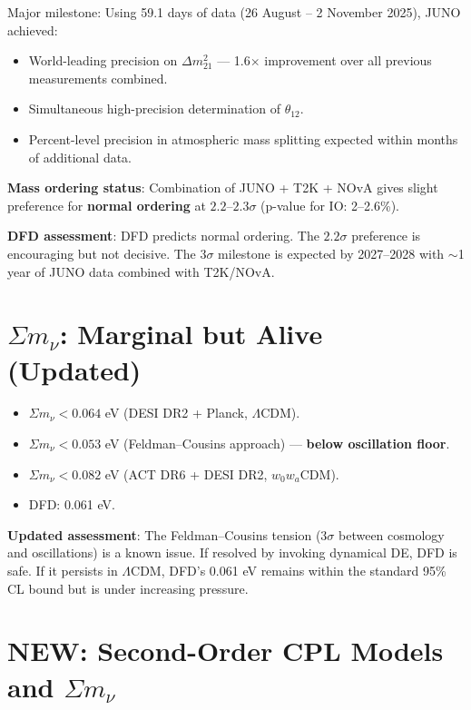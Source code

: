 \documentclass[11pt,a4paper]{article}
\newcommand{\NEW}{\textcolor{dfdblue}{\textbf{NEW}}}
\begin{document}
\begin{tcolorbox}[colback=green!5!white, colframe=green!60!black,
  title={JUNO First Physics Results (November 2025): $\Delta m^2_{21}$ and $\theta_{12}$}]

Major milestone: Using 59.1 days of data (26 August -- 2 November 2025), JUNO achieved:
\begin{itemize}
\item World-leading precision on $\Delta m^2_{21}$ --- 1.6$\times$ improvement over all previous measurements combined.
\item Simultaneous high-precision determination of $\theta_{12}$.
\item Percent-level precision in atmospheric mass splitting expected within months of additional data.
\end{itemize}

\textbf{Mass ordering status}: Combination of JUNO + T2K + NOvA gives slight preference for \textbf{normal ordering} at $2.2$--$2.3\sigma$ (p-value for IO: 2--2.6\%).

\textbf{DFD assessment}: DFD predicts normal ordering. The $2.2\sigma$ preference is encouraging but not decisive. The $3\sigma$ milestone is expected by 2027--2028 with $\sim$1 year of JUNO data combined with T2K/NOvA.
\end{tcolorbox}

\section{$\Sigma m_\nu$: Marginal but Alive (Updated)}

\begin{itemize}
\item $\Sigma m_\nu < 0.064$ eV (DESI DR2 + Planck, $\Lambda$CDM).
\item $\Sigma m_\nu < 0.053$ eV (Feldman--Cousins approach) --- \textbf{below oscillation floor}.
\item $\Sigma m_\nu < 0.082$ eV (ACT DR6 + DESI DR2, $w_0 w_a$CDM).
\item DFD: 0.061 eV.
\end{itemize}

\textbf{Updated assessment}: The Feldman--Cousins tension ($3\sigma$ between cosmology and oscillations) is a known issue. If resolved by invoking dynamical DE, DFD is safe. If it persists in $\Lambda$CDM, DFD's 0.061 eV remains within the standard 95\% CL bound but is under increasing pressure.

\section{\NEW: Second-Order CPL Models and $\Sigma m_\nu$}
\end{document}
